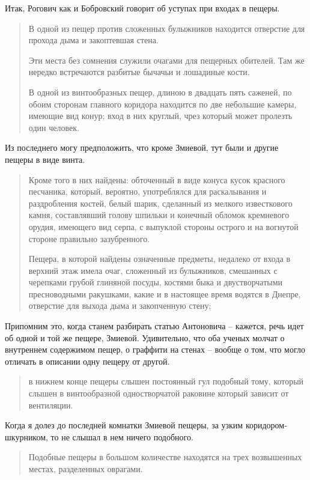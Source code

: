 Итак, Рогович как и Бобровский говорит об уступах при входах в пещеры.

\begin{quotation}
В одной из пещер против сложенных булыжников находится отверстие для прохода дыма и закоптевшая стена. 

Эти места без сомнения служили очагами для пещерных обителей. Там же нередко встречаются разбитые бычачьи и лошадиные кости.

В одной из винтообразных пещер, длиною в двадцать пять саженей, по обоим сторонам главного коридора  находится по две небольшие камеры, имеющие вид конур; вход в них круглый, чрез который может пролезть один человек.
\end{quotation}

Из последнего могу предположить, что кроме Змиевой, тут были и другие пещеры в виде винта.

\begin{quotation}
Кроме того в них найдены: обточенный в виде конуса кусок красного песчаника, который, вероятно, употреблялся для раскалывания и раздробления костей, белый шарик, сделанный из мелкого известкового камня, составлявший голову шпильки и конечный обломок кремневого орудия, имеющего вид серпа, с выпуклой стороны острого и на вогнутой стороне правильно зазубренного.

Пещера, в которой найдены означенные пре\-дметы, недалеко от входа в верхний этаж имела очаг, сложенный из булыжников, смешанных с черепками грубой глиняной посуды, костями быка и двустворчатыми пресноводными ракушками, какие и в настоящее время  водятся в Днепре, отверстие для выхода дыма и закопченную стену;
\end{quotation}

Припомним это, когда станем разбирать статью Антоновича – кажется, речь идет об одной и той же пещере, Змиевой. Удивительно, что оба ученых молчат о внутреннем содержимом пещер, о граффити на стенах – вообще о том, что могло отличать в описании одну пещеру от другой. 

\begin{quotation}
в нижнем конце пещеры слышен постоянный гул подобный тому, который слышен в винтообразной одностворчатой раковине который зависит от вентиляции.
\end{quotation}

Когда я долез до последней комнатки Змиевой пещеры, за узким коридором-шкурником, то не слышал в нем ничего подобного.

\begin{quotation}
Подобные пещеры в большом количестве находятся на трех возвышенных местах, разделенных оврагами. 
\end{quotation}


